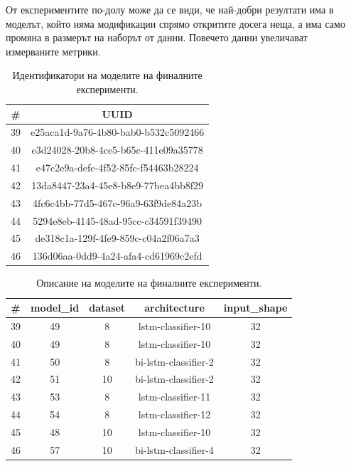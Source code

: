 \documentclass{article}
\begin{document}
От експериментите по-долу може да се види, че най-добри резултати има в моделът, който няма модификации спрямо
откритите досега неща, а има само промяна в размерът на наборът от данни. Повечето данни увеличават измерваните метрики.

\begin{table}[H]
\centering
\captionsetup{justification=centering}
\begin{tabular}{|c||c|}
\hline
\# & UUID\\
\hline
39 & e25aca1d-9a76-4b80-bab0-b532c5092466\\
40 & e3d24028-20b8-4ce5-b65c-411e09a35778\\
41 & e47c2e9a-defc-4f52-85fc-f54463b28224\\
42 & 13da8447-23a4-45e8-b8e9-77bea4bb8f29\\
43 & 4fc6c4bb-77d5-467c-96a9-63f9de84a23b\\
44 & 5294e8eb-4145-48ad-95cc-c34591f39490\\
45 & de318c1a-129f-4fe9-859c-c04a2f06a7a3\\
46 & 136d06aa-0dd9-4a24-afa4-cd61969c2efd\\
\hline
\end{tabular}
\caption{Идентификатори на моделите на финалните експерименти.}
\end{table}

\begin{table}[H]
\centering
\captionsetup{justification=centering}
\begin{tabular}{|c||c|c|c|c|}
\hline
\# & model\_id & dataset & architecture & input\_shape\\
\hline
39 & 49 & 8 & lstm-classifier-10 & 32\\
40 & 49 & 8 & lstm-classifier-10 & 32\\
41 & 50 & 8 & bi-lstm-classifier-2 & 32\\
42 & 51 & 10 & bi-lstm-classifier-2 & 32\\
43 & 53 & 8 & lstm-classifier-11 & 32\\
44 & 54 & 8 & lstm-classifier-12 & 32\\
45 & 48 & 10 & lstm-classifier-10 & 32\\
46 & 57 & 10 & bi-lstm-classifier-4 & 32\\
\hline
\end{tabular}
\caption{Описание на моделите на финалните експерименти.}
\end{table}
\end{document}
